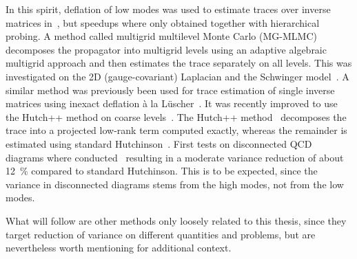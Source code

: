 In this spirit, deflation of low modes was used to estimate traces over inverse matrices in~\cite{Gambhir:2016uwp,Alcalde_2017}, but speedups where only obtained together with hierarchical probing.
A method called multigrid multilevel Monte Carlo (MG-MLMC) decomposes the propagator into multigrid levels using an adaptive algebraic multigrid approach and then estimates the trace separately on all levels.
This was investigated on the 2D (gauge-covariant) Laplacian and the Schwinger model~\cite{doi:10.1137/21M1441894:2022}.
A similar method was previously been used for trace estimation of single inverse matrices using inexact deflation à la Lüscher~\cite{Romero:2019psj}.
It was recently improved to use the Hutch++ method on coarse levels~\cite{Frommer:2022qiy}.
The Hutch++ method~\cite{doi:10.1137/1.9781611976496.16:2021} decomposes the trace into a projected low-rank term computed exactly, whereas the remainder is estimated using standard Hutchinson~\cite{Hutchinson01011990}.
First tests on disconnected QCD diagrams where conducted~\cite{Frommer:2025kfp} resulting in a moderate variance reduction of about \SI{12}{\percent} compared to standard Hutchinson.
This is to be expected, since the variance in disconnected diagrams stems from the high modes, not from the low modes.

What will follow are other methods only loosely related to this thesis, since they target reduction of variance on different quantities and problems, but are nevertheless worth mentioning for additional context.

